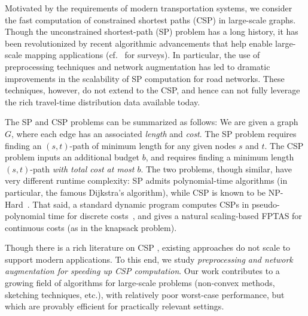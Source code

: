 Motivated by the requirements of modern transportation systems, we consider the fast computation of constrained shortest paths (CSP) in large-scale graphs. 
Though the unconstrained shortest-path (SP) problem has a long history, it has been revolutionized by recent algorithmic advancements that help enable large-scale mapping applications (cf.~\citep{goldberg_survey,dimacs09} for surveys).
In particular, the use of preprocessing techniques and network augmentation has led to dramatic improvements in the scalability of SP computation for road networks.
These techniques, however, do not extend to the CSP, and hence can not fully leverage the rich travel-time distribution data available today.

The SP and CSP problems can be summarized as follows: 
We are given a graph $G$, where each edge has an associated \emph{length} and \emph{cost}. 
The SP problem requires finding an $(s,t)$-path of minimum length for any given nodes $s$ and $t$. 
The CSP problem inputs an additional budget $b$, and requires finding a minimum length $(s,t)$-path \emph{with total cost at most $b$}.
The two problems, though similar, have very different runtime complexity: SP admits polynomial-time algorithms (in particular, the famous Dijkstra's algorithm), while CSP is known to be NP-Hard~\citep{csp_survey}.
That said, a standard dynamic program computes CSPs in pseudo-polynomial time for discrete costs~\citep{alex_bicriteria}, and gives a natural scaling-based FPTAS for continuous costs (as in the knapsack problem).

Though there is a rich literature on CSP \citep{csp_survey}, existing approaches do not scale to support modern applications. 
To this end, we study \emph{preprocessing and network augmentation for speeding up CSP computation}.
Our work contributes to a growing field of algorithms for large-scale problems (non-convex methods, sketching techniques, etc.), with relatively poor worst-case performance, but which are provably efficient for practically relevant settings.

